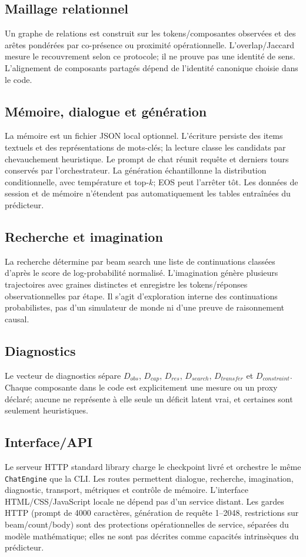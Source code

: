 \documentclass[11pt,a4paper]{article}
\begin{document}
\subsection{Maillage relationnel}
Un graphe de relations est construit sur les tokens/composantes observées et des arêtes pondérées par co-présence ou proximité opérationnelle. L'overlap/Jaccard mesure le recouvrement selon ce protocole; il ne prouve pas une identité de sens. L'alignement de composants partagés dépend de l'identité canonique choisie dans le code.
\subsection{Mémoire, dialogue et génération}
La mémoire est un fichier JSON local optionnel. L'écriture persiste des items textuels et des représentations de mots-clés; la lecture classe les candidats par chevauchement heuristique. Le prompt de chat réunit requête et derniers tours conservés par l'orchestrateur. La génération échantillonne la distribution conditionnelle, avec température et top-$k$; EOS peut l'arrêter tôt. Les données de session et de mémoire n'étendent pas automatiquement les tables entraînées du prédicteur.
\subsection{Recherche et imagination}
La recherche détermine par beam search une liste de continuations classées d'après le score de log-probabilité normalisé. L'imagination génère plusieurs trajectoires avec graines distinctes et enregistre les tokens/réponses observationnelles par étape. Il s'agit d'exploration interne des continuations probabilistes, pas d'un simulateur de monde ni d'une preuve de raisonnement causal.
\subsection{Diagnostics}
Le vecteur de diagnostics sépare $D_{obs}$, $D_{cap}$, $D_{res}$, $D_{search}$, $D_{transfer}$ et $D_{constraint}$. Chaque composante dans le code est explicitement une mesure ou un proxy déclaré; aucune ne représente à elle seule un déficit latent vrai, et certaines sont seulement heuristiques.
\subsection{Interface/API}
Le serveur HTTP standard library charge le checkpoint livré et orchestre le même \texttt{ChatEngine} que la CLI. Les routes permettent dialogue, recherche, imagination, diagnostic, transport, métriques et contrôle de mémoire. L'interface HTML/CSS/JavaScript locale ne dépend pas d'un service distant. Les gardes HTTP (prompt de 4000 caractères, génération de requête 1--2048, restrictions sur beam/count/body) sont des protections opérationnelles de service, séparées du modèle mathématique; elles ne sont pas décrites comme capacités intrinsèques du prédicteur.
\end{document}

